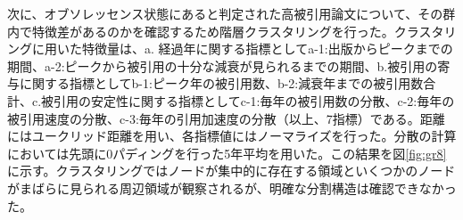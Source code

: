 次に、オブソレッセンス状態にあると判定された高被引用論文について、その群内で特徴差があるのかを確認するため階層クラスタリングを行った。クラスタリングに用いた特徴量は、a. 経過年に関する指標としてa-1:出版からピークまでの期間、a-2:ピークから被引用の十分な減衰が見られるまでの期間、b.被引用の寄与に関する指標としてb-1:ピーク年の被引用数、b-2:減衰年までの被引用数合計、c.被引用の安定性に関する指標としてc-1:毎年の被引用数の分散、c-2:毎年の被引用速度の分散、c-3:毎年の引用加速度の分散（以上、7指標）である。距離にはユークリッド距離を用い、各指標値にはノーマライズを行った。分散の計算においては先頭に0パディングを行った5年平均を用いた。この結果を図\ref{fig:gr8}に示す。クラスタリングではノードが集中的に存在する領域といくつかのノードがまばらに見られる周辺領域が観察されるが、明確な分割構造は確認できなかった。
